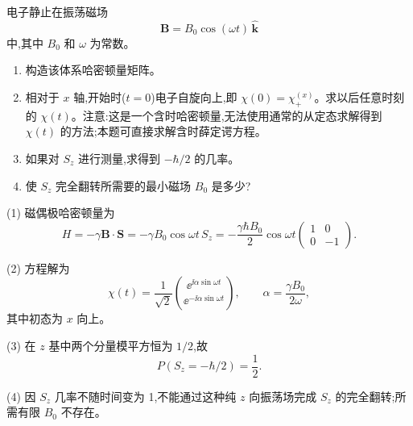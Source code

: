 \begin{question}
电子静止在振荡磁场
\[
\mathbf B=B_0\cos(\omega t)\,\hat{\mathbf k}
\]
中,其中 $B_0$ 和 $\omega$ 为常数。
\begin{enumerate}
\item 构造该体系哈密顿量矩阵。
\item 相对于 $x$ 轴,开始时($t=0$)电子自旋向上,即 $\chi(0)=\chi_+^{(x)}$。求以后任意时刻的 $\chi(t)$。注意:这是一个含时哈密顿量,无法使用通常的从定态求解得到 $\chi(t)$ 的方法;本题可直接求解含时薛定谔方程。
\item 如果对 $S_z$ 进行测量,求得到 $-\hbar/2$ 的几率。
\item 使 $S_z$ 完全翻转所需要的最小磁场 $B_0$ 是多少?
\end{enumerate}
\end{question}
\begin{solution}

(1) 磁偶极哈密顿量为
\[
H=-\gamma \mathbf B\cdot\mathbf S=-\gamma B_0\cos\omega t\,S_z
=-\frac{\gamma\hbar B_0}{2}\cos\omega t
\begin{pmatrix}1&0\\0&-1\end{pmatrix}.
\]

(2) 方程解为
\[
\chi(t)=\frac1{\sqrt2}\binom{\ee^{\ii\alpha\sin\omega t}}{\ee^{-\ii\alpha\sin\omega t}},
\qquad
\alpha=\frac{\gamma B_0}{2\omega},
\]
其中初态为 $x$ 向上。

(3) 在 $z$ 基中两个分量模平方恒为 $1/2$,故
\[
P(S_z=-\hbar/2)=\frac12.
\]

(4) 因 $S_z$ 几率不随时间变为 1,不能通过这种纯 $z$ 向振荡场完成 $S_z$ 的完全翻转;所需有限 $B_0$ 不存在。

\end{solution}

